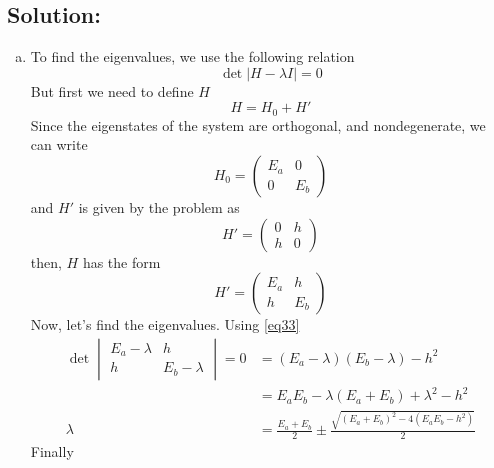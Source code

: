 \documentclass[12 pt]{article}
\numberwithin{equation}{section}
\begin{document}
\subsection*{Solution:}
\begin{enumerate}[a)]
  \item

    To find the eigenvalues, we use the following relation
    \begin{equation}\label{eq33}
      \det\big|H-\lambda I\big| = 0
    \end{equation}
    But first we need to define $H$
    \begin{equation}\label{eq34}
H = H_0 + H'
    \end{equation}
Since the eigenstates of the system are orthogonal, and nondegenerate, we can write 
\begin{equation}\label{eq35}
  H_0 = 
  \begin{pmatrix}
    E_a & 0\\
    0 & E_b
  \end{pmatrix}
\end{equation}
and $H'$ is given by the problem as 
\begin{equation}\label{eq36}
  H' = \begin{pmatrix}
    0 & h\\
    h & 0
  \end{pmatrix}
\end{equation}
then, $H$ has the form 
\begin{equation}\label{eq37}
  H' = \begin{pmatrix}
    E_a & h\\
    h & E_b
  \end{pmatrix}
\end{equation}
Now, let's find the eigenvalues. Using \autoref{eq33}
\begin{equation}\label{eq38}
  \begin{aligned}
  \det \begin{vmatrix}
    E_a-\lambda & h\\
    h & E_b-\lambda
  \end{vmatrix} = 0 &= (E_a-\lambda)(E_b-\lambda) - h^2\\
  &= E_aE_b -\lambda(E_a+E_b) + \lambda^2 -h^2\\
    \lambda &= \frac{E_a+E_b}{2}\pm \frac{\sqrt{(E_a+E_b)^2 - 4(E_aE_b -h^2)}}{2}
\end{aligned}
\end{equation}
Finally 
\begin{equation}\label{eq39}

\end{equation}
\end{enumerate}
\end{document}
